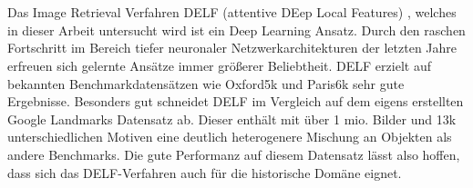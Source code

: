 \\\\
Das Image Retrieval Verfahren DELF (attentive DEep Local Features) \cite{delf}, welches in dieser Arbeit untersucht wird ist ein Deep Learning Ansatz. Durch den raschen Fortschritt im Bereich tiefer neuronaler Netzwerkarchitekturen der letzten Jahre erfreuen sich gelernte Ansätze immer größerer Beliebtheit. DELF erzielt auf bekannten Benchmarkdatensätzen wie Oxford5k \cite{oxford5k} und Paris6k \cite{paris6k} sehr gute Ergebnisse. Besonders gut schneidet DELF im Vergleich auf dem eigens erstellten Google Landmarks Datensatz \cite{landmarks} ab. Dieser enthält mit über 1 mio. Bilder und 13k unterschiedlichen Motiven eine deutlich heterogenere Mischung an Objekten als andere Benchmarks. Die gute Performanz auf diesem Datensatz lässt also hoffen, dass sich das DELF-Verfahren auch für die historische Domäne eignet.


